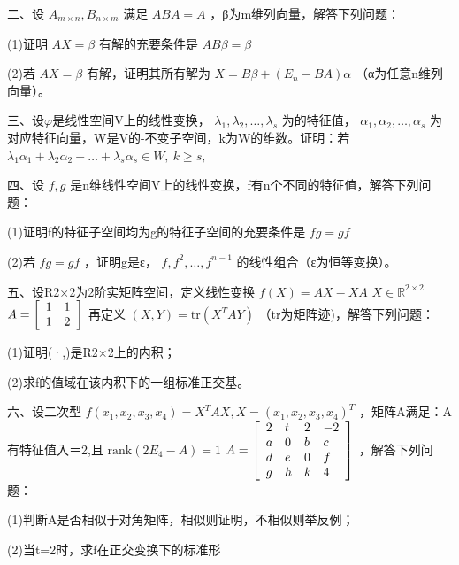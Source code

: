 \documentclass[11pt,fontset=fandol]{ctexart}
\begin{document}
二、设 \(A _ { m \times n } , B _ { n \times m }\) 满足 \(A B A = A\)
，β为m维列向量，解答下列问题：

(1)证明 \(A X = \beta\) 有解的充要条件是 \(A B \beta = \beta\)

(2)若 \(A X = \beta\) 有解，证明其所有解为
\(\displaystyle X = B \beta + ( E _ { n } - B A ) \alpha\)
（α为任意n维列向量）。

三、设\(\varphi\)是线性空间V上的线性变换，
\(\lambda _ { 1 } , \lambda _ { 2 } , \ldots , \lambda _ { s }\)
为的特征值，
\(\alpha _ { 1 } , \alpha _ { 2 } , \ldots , \alpha _ { s }\)
为对应特征向量，W是V的-不变子空间，k为W的维数。证明：若
\(\lambda _ { 1 } \alpha _ { 1 } + \lambda _ { 2 } \alpha _ { 2 } + \dots + \lambda _ { s } \alpha _ { s } \in W , \ k \geq s ,\)

四、设 \(f , g\)
是n维线性空间V上的线性变换，f有n个不同的特征值，解答下列问题：

(1)证明f的特征子空间均为g的特征子空间的充要条件是 \(f g = g f\)

(2)若 \(f g = g f\) ，证明g是ε，
\(f , f ^ { 2 } , \ldots , f ^ { n - 1 }\) 的线性组合（ε为恒等变换）。

五、设R2×2为2阶实矩阵空间，定义线性变换 \(f ( X ) = A X - X A\)
\(X \in \mathbb { R } ^ { 2 \times 2 }\)
\(A = { \left[ \begin{array} { l l } { 1 } & { 1 } \\ { 1 } & { 2 } \end{array} \right] }\)
再定义 \(( X , Y ) = \mathrm { t r } ( X ^ { T } A Y )\)
（tr为矩阵迹)，解答下列问题：

(1)证明(·,)是R2×2上的内积；

(2)求f的值域在该内积下的一组标准正交基。

六、设二次型
\(f ( x _ { 1 } , x _ { 2 } , x _ { 3 } , x _ { 4 } ) = X ^ { T } A X , X = ( x _ { 1 } , x _ { 2 } , x _ { 3 } , x _ { 4 } ) ^ { T }\)
，矩阵A满足：A有特征值入＝2,且
\(\mathrm { r a n k } ( 2 E _ { 4 } - A ) = 1\)
\(A = { \left[ \begin{array} { l l l l } { 2 } & { t } & { 2 } & { - 2 } \\ { a } & { 0 } & { b } & { c } \\ { d } & { e } & { 0 } & { f } \\ { g } & { h } & { k } & { 4 } \end{array} \right] }\)
，解答下列问题：

(1)判断A是否相似于对角矩阵，相似则证明，不相似则举反例；

(2)当t=2时，求f在正交变换下的标准形
\end{document}
